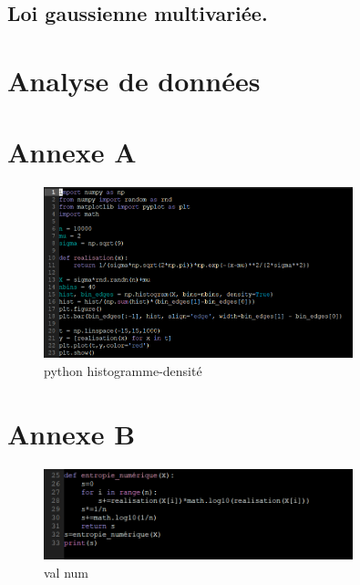 \documentclass[a4paper]{article}
\begin{document}
\subsection{Loi gaussienne multivariée.}
\newpage

\section{Analyse de données}

\appendix
\section{Annexe A}
\begin{figure}[h]
  \centering
  \includegraphics[width=0.8\textwidth]{1.png}
  \caption{python histogramme-densité}
\end{figure}

\section{Annexe B}
\begin{figure}[h]
  \centering
  \includegraphics[width=0.8\textwidth]{2.png}
  \caption{val num}
\end{figure}
\end{document}
